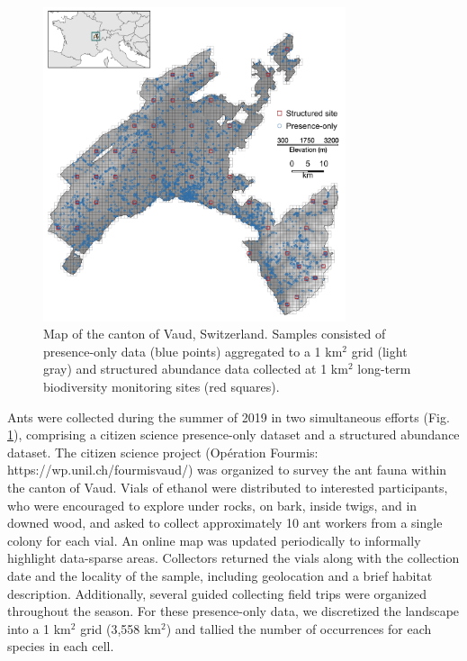 \documentclass[preprint,final,times,12pt,3p]{elsarticle}
\begin{document}
\begin{figure}
	\centering\includegraphics[width=3.5in]{../../../ms/1_Ecography/1/figs/map_VD+inset.png}
	\caption{\label{fig:VD_map} Map of the canton of Vaud, Switzerland. Samples consisted of presence-only data (blue points) aggregated to a 1 km$^2$ grid (light gray) and structured abundance data collected at 1 km$^2$ long-term biodiversity monitoring sites (red squares). }
\end{figure}

Ants were collected during the summer of 2019 in two simultaneous efforts (Fig. \ref{fig:VD_map}), comprising a citizen science presence-only dataset and a structured abundance dataset. The citizen science project (Opération Fourmis: https://wp.unil.ch/fourmisvaud/) was organized to survey the ant fauna within the canton of Vaud. Vials of ethanol were distributed to interested participants, who were encouraged to explore under rocks, on bark, inside twigs, and in downed wood, and asked to collect approximately 10 ant workers from a single colony for each vial. An online map was updated periodically to informally highlight data-sparse areas. Collectors returned the vials along with the collection date and the locality of the sample, including geolocation and a brief habitat description. Additionally, several guided collecting field trips were organized throughout the season. For these presence-only data, we discretized the landscape into a 1 km$^2$ grid (3,558 km$^2$) and tallied the number of occurrences for each species in each cell. 
\end{document}
